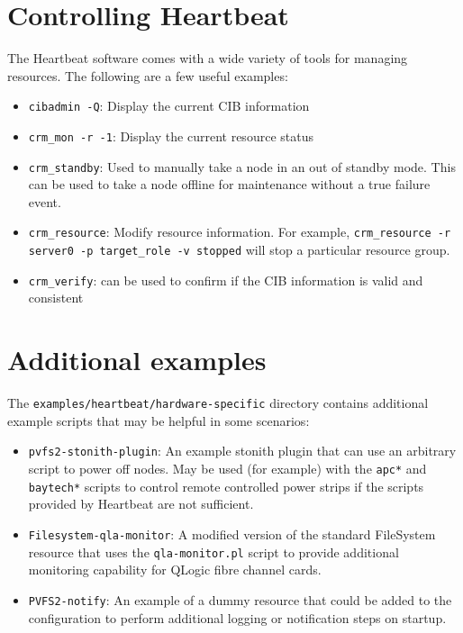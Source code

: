 \documentclass[11pt]{article}
\begin{document}
\section{Controlling Heartbeat}

The Heartbeat software comes with a wide variety of tools for managing
resources.  The following are a few useful examples:
\begin{itemize}
\item \texttt{cibadmin -Q}: Display the current CIB information
\item \texttt{crm\_mon -r -1}: Display the current resource status
\item \texttt{crm\_standby}: Used to manually take a node in an out of
standby mode.  This can be used to take a node offline for maintenance
without a true failure event.
\item \texttt{crm\_resource}: Modify resource information.  For example,
\texttt{crm\_resource -r server0 -p target\_role -v stopped} will stop a
particular resource group.
\item \texttt{crm\_verify}: can be used to confirm if the CIB
information is valid and consistent
\end{itemize}

\section{Additional examples}

The \texttt{examples/heartbeat/hardware-specific} directory contains
additional example scripts that may be helpful in some scenarios:

\begin{itemize}
\item \texttt{pvfs2-stonith-plugin}: An example stonith plugin
that can use an arbitrary script to power off nodes.  May be used (for
example) with the \texttt{apc*} and \texttt{baytech*} scripts to control
remote controlled power strips if the scripts provided by Heartbeat are
not sufficient.
\item \texttt{Filesystem-qla-monitor}: A modified version of the
standard FileSystem resource that uses the \texttt{qla-monitor.pl}
script to provide additional monitoring capability for QLogic fibre
channel cards. 
\item \texttt{PVFS2-notify}: An example of a dummy resource that could
be added to the configuration to perform additional logging or
notification steps on startup.
\end{itemize}
\end{document}
